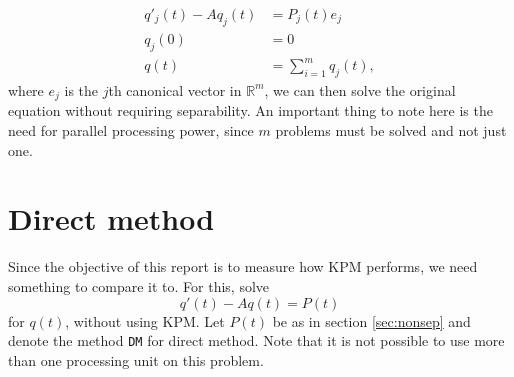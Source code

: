 \begin{equation}
\begin{aligned}
q'_j(t) -A q_j(t) &= P_j(t) e_j \\
q_j(0) &= 0\\
q(t) &= \sum \limits_{i = 1}^m q_j(t),
\end{aligned}
\end{equation}
where $e_j$ is the $j$th canonical vector in $\mathbb{R}^{m}$, we can then solve the original equation without requiring separability. 
An important thing to note here is the need for parallel processing power, since $m$ problems must be solved and not just one.
\section{Direct method} \label{sec:DM}
Since the objective of this report is to measure how KPM performs, we need something to compare it to. For this, solve 
\begin{equation} \label{eqn:DI}
q'(t) -A q(t) = P(t)
\end{equation}
for $q(t)$, without using KPM. Let $P(t)$ be as in section \ref{sec:nonsep} and denote the method \texttt{DM} for direct method. Note that it is not possible to use more than one processing unit on this problem.
